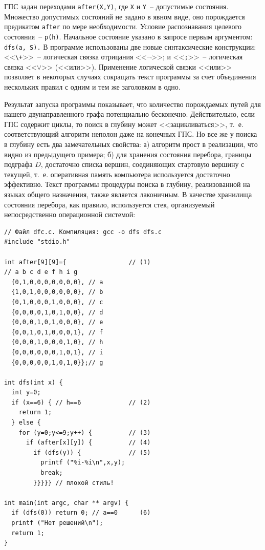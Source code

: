 \documentclass[a4paper,14pt, openany, twoside, draft]{extbook} %
\begin{document}
ГПС задан переходами \texttt{after(X,Y)}, где \texttt{X} и \texttt{Y}~-- допустимые состояния.  Множество допустимых состояний не задано в явном виде, оно порождается предикатом \texttt{after} по мере необходимости.  Условие распознавания целевого состояния~-- \texttt{p(h)}.  Начальное состояние указано в запросе первым аргументом: \texttt{dfs(a, S).}  В программе использованы две новые синтаксические конструкции: <<\texttt{\backslash +}>>~--  логическая связка отрицания <<$\neg$>>; и <<\texttt{;}>>~-- логическая связка <<$\vee$>> (<<или>>).  Применение  логической связки <<или>> позволяет в некоторых случаях сокращать текст программы за счет объединения нескольких правил с одним и тем же заголовком в одно.

Результат запуска программы показывает, что количество порождаемых путей для нашего двунаправленного графа потенциально бесконечно.  Действительно, если ГПС содержит циклы, то поиск в глубину может <<зацикливаться>>, т.~е. соответствующий алгоритм неполон даже на конечных ГПС.  Но все же у поиска в глубину есть два замечательных свойства: а) алгоритм прост в реализации, что видно из предыдущего примера; б) для хранения состояния перебора, границы подграфа $D$, достаточно списка вершин, соединяющих стартовую вершину с текущей, т.~е. оперативная память компьютера используется достаточно эффективно.  Текст программы процедуры поиска в глубину, реализованной на языках общего назначения, также является лаконичным.  В качестве хранилища состояния перебора, как правило, используется стек, организуемый непосредственно операционной системой:

\begin{verbatim}
// Файл dfc.c. Компиляция: gcc -o dfs dfs.c
#include "stdio.h"

int after[9][9]={                 // (1)
// a b c d e f h i g
  {0,1,0,0,0,0,0,0,0}, // a
  {1,0,1,0,0,0,0,0,0}, // b
  {0,1,0,0,0,1,0,0,0}, // c
  {0,0,0,0,1,0,1,0,0}, // d
  {0,0,0,1,0,1,0,0,0}, // e
  {0,0,1,0,1,0,0,0,1}, // f
  {0,0,0,1,0,0,0,1,0}, // h
  {0,0,0,0,0,0,1,0,1}, // i
  {0,0,0,0,0,1,0,1,0}};// g

int dfs(int x) {
  int y=0;
  if (x==6) { // h==6             // (2)
    return 1;
  } else {
    for (y=0;y<=9;y++) {          // (3)
      if (after[x][y]) {          // (4)
        if (dfs(y)) {             // (5)
          printf ("%i-%i\n",x,y);
          break;
        }}}}} // плохой стиль!

int main(int argc, char ** argv) {
  if (dfs(0)) return 0; // a==0      (6)
  printf ("Нет решений\n");
  return 1;
}
\end{verbatim}
\end{document}

